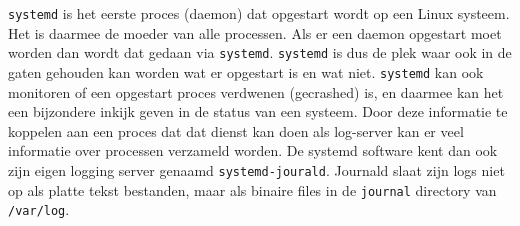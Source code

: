 \texttt{systemd} is het eerste proces (daemon) dat opgestart wordt op een Linux systeem. Het is daarmee de moeder van alle processen. Als er een daemon opgestart moet worden dan wordt dat gedaan via \texttt{systemd}. \texttt{systemd} is dus de plek waar ook in de gaten gehouden kan worden wat er opgestart is en wat niet. \texttt{systemd} kan ook monitoren of een opgestart proces verdwenen (gecrashed) is, en daarmee kan het een bijzondere inkijk geven in de status van een systeem. Door deze informatie te koppelen aan een proces dat dat dienst kan doen als log-server kan er veel informatie over processen verzameld worden. De systemd software kent dan ook zijn eigen logging server genaamd \texttt{systemd-jourald}. Journald slaat zijn logs niet op als platte tekst bestanden, maar als binaire files in de \texttt{journal} directory van \texttt{/var/log}.

